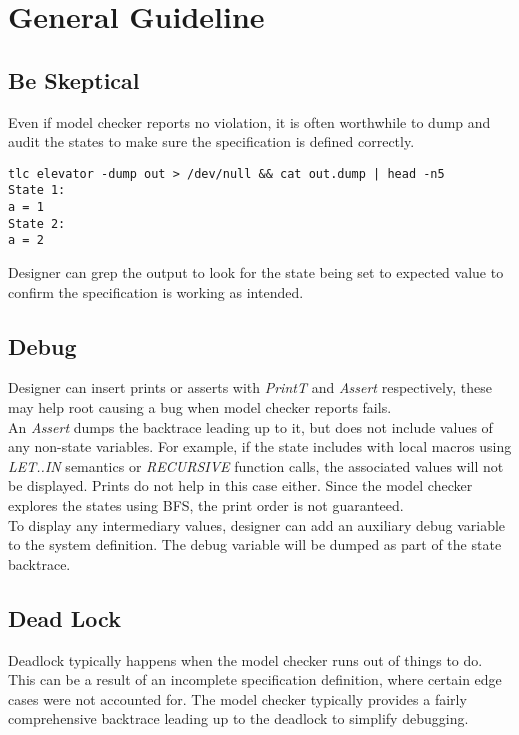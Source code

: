\chapter{General Guideline}

\section{Be Skeptical}

Even if model checker reports no violation, it is often worthwhile to dump and
audit the states to make sure the specification is defined correctly.

\begin{verbatim}
tlc elevator -dump out > /dev/null && cat out.dump | head -n5
State 1:
a = 1
State 2:
a = 2
\end{verbatim}

Designer can grep the output to look for the state being set to expected value
to confirm the specification is working as intended.

\section{Debug} 

Designer can insert prints or asserts with \textit{PrintT} and \textit{Assert}
respectively, these may help root causing a bug when model checker reports fails.\\

An \textit{Assert} dumps the backtrace leading up to it, but does not include values of
any non-state variables. For example, if the state includes with local macros
using \textit{LET..IN} semantics or \textit{RECURSIVE} function calls, the associated values will
not be displayed. Prints do not help in this case either. Since the model
checker explores the states using BFS, the print order is not guaranteed.\\

To display any intermediary values, designer can add an auxiliary debug variable
to the system definition. The debug variable will be dumped as part of the state
backtrace.

\section{Dead Lock}

Deadlock typically happens when the model checker runs out of things to do. This
can be a result of an incomplete specification definition, where certain edge
cases were not accounted for. The model checker typically provides a fairly
comprehensive backtrace leading up to the deadlock to simplify debugging.

